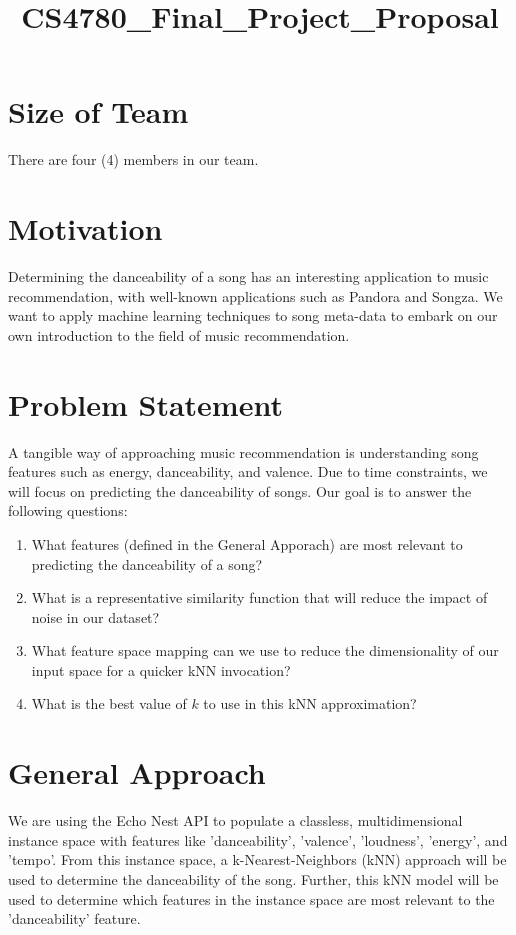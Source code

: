 \documentclass{article}
\title{CS4780_Final_Project_Proposal}
\begin{document}

\section{Size of Team}
There are four (4) members in our team.

\section{Motivation}
Determining the danceability of a song has an interesting application to music recommendation, with well-known applications such as Pandora and Songza. We want to apply machine learning techniques to song meta-data to embark on our own introduction to the field of music recommendation.

\section{Problem Statement}
A tangible way of approaching music recommendation is understanding song features such as energy, danceability, and valence. Due to time constraints, we will focus on predicting the danceability of songs. Our goal is to answer the following questions:

\begin{enumerate}
\item What features (defined in the General Apporach) are most relevant to predicting the danceability of a song?
\item What is a representative similarity function that will reduce the impact of noise in our dataset?
\item What feature space mapping can we use to reduce the dimensionality of our input space for a quicker kNN invocation?
\item What is the best value of $ k $ to use in this kNN approximation?
\end{enumerate}

\section{General Approach}
We are using the Echo Nest API to populate a classless, multidimensional instance space with features like 'danceability', 'valence', 'loudness', 'energy', and 'tempo'. From this instance space, a k-Nearest-Neighbors (kNN) approach will be used to determine the danceability of the song. Further, this kNN model will be used to determine which features in the instance space are most relevant to the 'danceability' feature.
\end{document}

